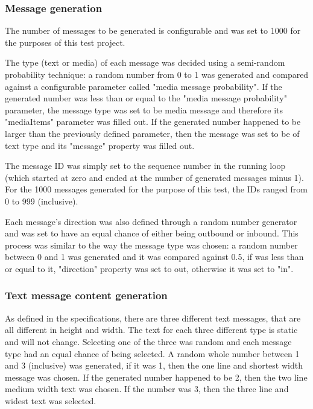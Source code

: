 \documentclass[a4paper,12pt]{article}
\begin{document}
\subsubsection*{Message generation}
The number of messages to be generated is configurable and was set to 1000 for the purposes of this test project.

The type (text or media) of each message was decided using a semi-random probability technique: a random number
from 0 to 1 was generated and compared against a configurable parameter called "media message probability". If the
generated number was less than or equal to the "media message probability" parameter, the message type was set to be
media message and therefore its "mediaItems" parameter was filled out. If the generated number happened to be larger
than the previously defined parameter, then the message was set to be of text type and its "message" property was filled out.

The message ID was simply set to the sequence number in the running loop (which started at zero and ended at the number of
generated messages minus 1). For the 1000 messages generated for the purpose of this test, the IDs ranged from 0 to 999
(inclusive).

Each message's direction was also defined through a random number generator and was set to have an equal chance of either
being outbound or inbound. This process was similar to the way the message type was chosen: a random number between 0 and
1 was generated and it was compared against 0.5, if was less than or equal to it, "direction" property was set to out,
otherwise it was set to "in".

\subsubsection*{Text message content generation}
As defined in the specifications, there are three different text messages, that are all different in height and width. The
text for each three different type is static and will not change. Selecting one of the three was random and each message type
had an equal chance of being selected. A random whole number between 1 and 3 (inclusive) was generated, if it was 1, then the
one line and shortest width message was chosen. If the generated number happened to be 2, then the two line medium width
text was chosen. If the number was 3, then the three line and widest text was selected.
\end{document}
